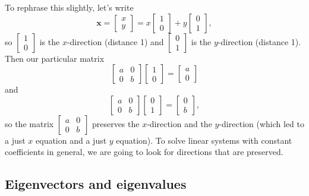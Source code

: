 \documentclass[12pt]{amsart}
\numberwithin{equation}{section}
\theoremstyle{plain} %
\theoremstyle{definition}
\theoremstyle{remark}
\begin{document}
 
To rephrase this slightly, let's write
\[ \mathbf{x} = \begin{bmatrix} x \\ y \end{bmatrix}  = x \begin{bmatrix} 1 \\ 0 \end{bmatrix} + y \begin{bmatrix} 0 \\ 1 \end{bmatrix},\]
so $\begin{bmatrix} 1 \\ 0 \end{bmatrix}$ is the $x$-direction (distance 1) and $\begin{bmatrix} 0 \\ 1 \end{bmatrix}$ is the $y$-direction (distance 1).
Then our particular matrix 
\[ \begin{bmatrix} a & 0 \\ 0 & b\end{bmatrix} \begin{bmatrix} 1 \\ 0 \end{bmatrix} =\begin{bmatrix} a \\ 0 \end{bmatrix}\]
and 
\[ \begin{bmatrix} a & 0 \\ 0 & b\end{bmatrix} \begin{bmatrix} 0 \\ 1 \end{bmatrix} =\begin{bmatrix} 0 \\ b \end{bmatrix},\]
so the matrix $\begin{bmatrix} a & 0 \\ 0 & b\end{bmatrix}$ preserves the $x$-direction and the $y$-direction (which led to a just $x$ equation and a just $y$ equation). To solve linear systems with constant coefficients in general, we are going to look for directions that are preserved.

\subsection*{Eigenvectors and eigenvalues}
\end{document}
